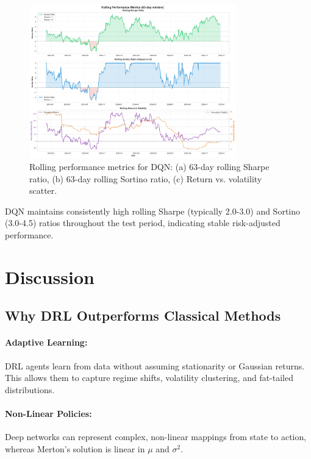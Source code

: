 \documentclass[12pt]{article}
\begin{document}
\begin{figure}[h]
    \centering
    \includegraphics[width=0.8\textwidth]{../simulations/enhanced_viz/rolling_metrics.png}
    \caption{Rolling performance metrics for DQN: (a) 63-day rolling Sharpe ratio, (b) 63-day rolling Sortino ratio, (c) Return vs. volatility scatter.}
    \label{fig:rolling}
\end{figure}

DQN maintains consistently high rolling Sharpe (typically 2.0-3.0) and Sortino (3.0-4.5) ratios throughout the test period, indicating stable risk-adjusted performance.

\section{Discussion}

\subsection{Why DRL Outperforms Classical Methods}

\paragraph{Adaptive Learning:}
DRL agents learn from data without assuming stationarity or Gaussian returns. This allows them to capture regime shifts, volatility clustering, and fat-tailed distributions.

\paragraph{Non-Linear Policies:}
Deep networks can represent complex, non-linear mappings from state to action, whereas Merton's solution is linear in $\mu$ and $\sigma^2$.
\end{document}
